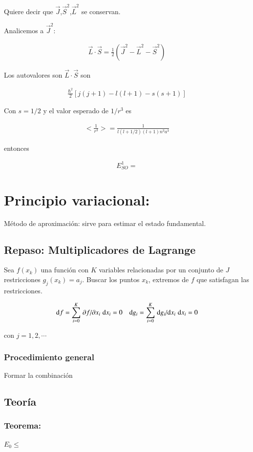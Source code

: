 Quiere decir que $\vec{J}$,$\vec{S}^2$,$\vec{L}^2$ se conservan.

Analicemos a $\vec{J}^2$:

\begin{align*}
    \vec{L}\cdot\vec{S}=\frac{1}{2}\left(\vec{J}^2-\vec{L}^2-\vec{S}^2\right)
\end{align*}

Los autovalores son $\vec{L}\cdot\vec{S}$ son

\begin{align*}
    \frac{\hbar^2}{2}\left[j(j+1)-l(l+1)-s(s+1)\right]
\end{align*}

Con $s=1/2$ y el valor esperado de $1/r^3$ es 

\begin{align*}
    < \frac{1}{r^3} > = \frac{1}{l(l+1/2)(l+1)n^3a^3}
\end{align*}


entonces

\begin{align*}
    E^1_{SO}=
\end{align*}

\section{Principio variacional:}

Método de aproximación: sirve para estimar el estado fundamental.

\subsection{Repaso: Multiplicadores de Lagrange}

Sea $f({x_k})$ una función con $K$ variables relacionadas por un conjunto de $J$ restricciones $g_j({x_k})=a_j$.
Buscar los puntos ${x_k}$, extremos de $f$ que satisfagan las restricciones.

\begin{align*}
    \dd{f}=\sum_{i=0}^K\pdv*{f}{x_i}\dd x_i = 0 && \dd g_i=\sum_{i=0}^K\dv*{g_i}{x_i}\dd x_i=0
\end{align*}

con $j=1,2,\cdots$

\subsubsection{Procedimiento general}

Formar la combinación 


\subsection{Teoría}

\subsubsection{Teorema:} $E_0\leq $
